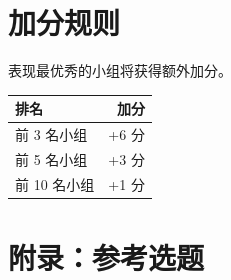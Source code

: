 \documentclass[UTF8, 10pt]{ctexart}
\begin{document}
\section{加分规则}

表现最优秀的小组将获得额外加分。

\begin{center}
\begin{tabular}{lr}
\toprule
排名 & 加分 \\
\midrule
前 3 名小组 & +6 分 \\
前 5 名小组 & +3 分 \\
前 10 名小组 & +1 分 \\
\bottomrule
\end{tabular}
\end{center}

\section*{附录：参考选题}
\end{document}
